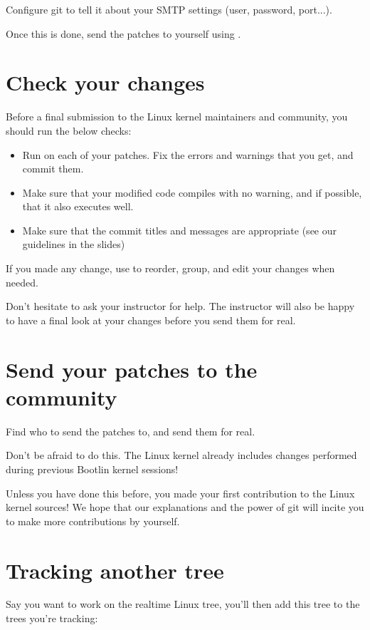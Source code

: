 Configure git to tell it about your SMTP settings (user, password, port...).

Once this is done, send the patches to yourself using .

\section{Check your changes}

Before a final submission to the Linux kernel maintainers and community, you
should run the below checks:

\begin{itemize}
\item Run  on each of your patches.
      Fix the errors and warnings that you get, and commit them.
\item Make sure that your modified code compiles with no warning,
      and if possible, that it also executes well.
\item Make sure that the commit titles and messages are appropriate
      (see our guidelines in the slides)
\end{itemize}

If you made any change, use  to
reorder, group, and edit your changes when needed.

Don't hesitate to ask your instructor for help. The instructor will also
be happy to have a final look at your changes before you send them for real.

\section{Send your patches to the community}

Find who to send the patches to, and send them for real.

Don't be afraid to do this. The Linux kernel already includes changes
performed during previous Bootlin kernel sessions!

Unless you have done this before, you made your first contribution
to the Linux kernel sources! We hope that our explanations and the power
of git will incite you to make more contributions by yourself.

\section{Tracking another tree}

Say you want to work on the realtime Linux tree, you'll then add this
tree to the trees you're tracking:

